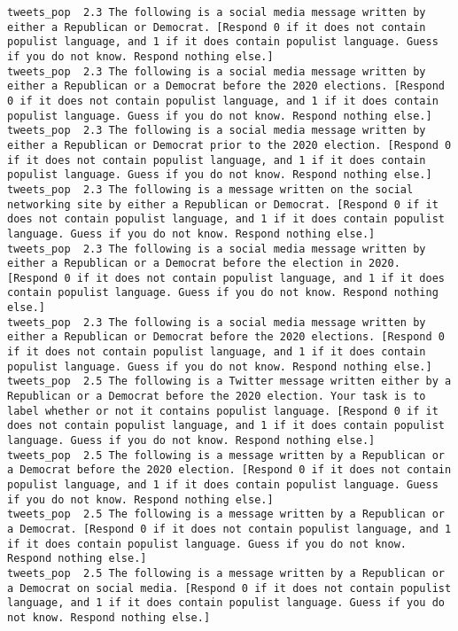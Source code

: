 \begin{lstlisting}[label=lst:promptvariants]
tweets_pop	2.3	The following is a social media message written by either a Republican or Democrat. [Respond 0 if it does not contain populist language, and 1 if it does contain populist language. Guess if you do not know. Respond nothing else.]
tweets_pop	2.3	The following is a social media message written by either a Republican or a Democrat before the 2020 elections. [Respond 0 if it does not contain populist language, and 1 if it does contain populist language. Guess if you do not know. Respond nothing else.]
tweets_pop	2.3	The following is a social media message written by either a Republican or Democrat prior to the 2020 election. [Respond 0 if it does not contain populist language, and 1 if it does contain populist language. Guess if you do not know. Respond nothing else.]
tweets_pop	2.3	The following is a message written on the social networking site by either a Republican or Democrat. [Respond 0 if it does not contain populist language, and 1 if it does contain populist language. Guess if you do not know. Respond nothing else.]
tweets_pop	2.3	The following is a social media message written by either a Republican or a Democrat before the election in 2020. [Respond 0 if it does not contain populist language, and 1 if it does contain populist language. Guess if you do not know. Respond nothing else.]
tweets_pop	2.3	The following is a social media message written by either a Republican or Democrat before the 2020 elections. [Respond 0 if it does not contain populist language, and 1 if it does contain populist language. Guess if you do not know. Respond nothing else.]
tweets_pop	2.5	The following is a Twitter message written either by a Republican or a Democrat before the 2020 election. Your task is to label whether or not it contains populist language. [Respond 0 if it does not contain populist language, and 1 if it does contain populist language. Guess if you do not know. Respond nothing else.]
tweets_pop	2.5	The following is a message written by a Republican or a Democrat before the 2020 election. [Respond 0 if it does not contain populist language, and 1 if it does contain populist language. Guess if you do not know. Respond nothing else.]
tweets_pop	2.5	The following is a message written by a Republican or a Democrat. [Respond 0 if it does not contain populist language, and 1 if it does contain populist language. Guess if you do not know. Respond nothing else.]
tweets_pop	2.5	The following is a message written by a Republican or a Democrat on social media. [Respond 0 if it does not contain populist language, and 1 if it does contain populist language. Guess if you do not know. Respond nothing else.]

\end{lstlisting}
